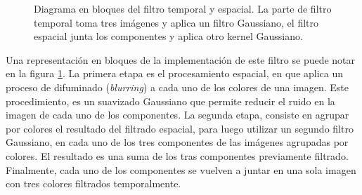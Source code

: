 \begin{figure}[h!]
\centering
\caption[Filtro temporal spacial]{Diagrama en bloques del filtro temporal y espacial. La parte de filtro temporal toma tres imágenes y aplica un filtro Gaussiano, el filtro espacial junta los componentes y aplica otro kernel Gaussiano.}
\label{fig:spatio_temporal_filter}
\end{figure}


Una representación en bloques de la implementación de este filtro se puede notar en la figura \ref{fig:spatio_temporal_filter}. La primera etapa es el procesamiento espacial, en que aplica un proceso de difuminado (\textit{blurring}) a cada uno de los colores de una imagen. Este procedimiento, es un suavizado Gaussiano que permite reducir el ruido en la imagen de cada uno de los componentes. La segunda etapa, consiste en agrupar por colores el resultado del filtrado espacial, para luego utilizar un segundo filtro Gaussiano, en cada uno de los tres componentes de las imágenes agrupadas por colores. El resultado es una suma de los tras componentes previamente filtrado. Finalmente, cada uno de los componentes se vuelven a juntar en una sola imagen con tres colores filtrados temporalmente.


